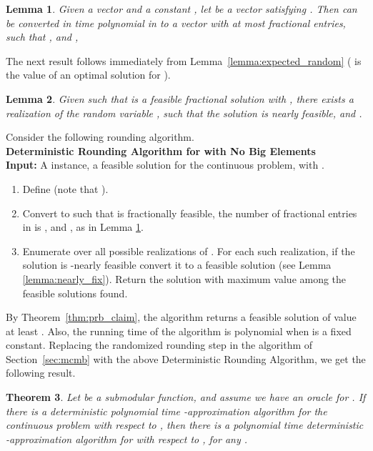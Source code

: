 \documentclass[11pt]{article}
\newtheorem{theorem}{Theorem}[section]
\newtheorem{lemma}[theorem]{Lemma}
\begin{document}
{\begin{lemma}
\label{lemma:multiple_pipage}
Given a vector  and a constant ,
let  be a vector satisfying
.
Then  can be converted in time polynomial in  to a vector
 with at most 
  fractional entries, such that ,
and ,
\end{lemma}


The next result follows immediately from
Lemma~\ref{lemma:expected_random} ( is the value of an optimal solution for ).

\begin{lemma}
\label{lemma:expected_enumeration}
Given  such that  is a feasible fractional solution
with ,
there exists
a realization of the random variable , such that the solution
 is nearly feasible, and .
\end{lemma}
}

Consider the following rounding algorithm.\\

\noindent
{\bf Deterministic Rounding Algorithm for  with No Big Elements} \\
\noindent
{\bf Input:} A  instance, a feasible solution   for the continuous problem, with
.
\begin{enumerate}
\item
Define 
(note that ).
\item Convert  to 
such that  is fractionally feasible, the number
of fractional entries in  is , and
,
as in Lemma \ref{lemma:multiple_pipage}.
\item Enumerate over all possible realizations of .
For each such realization,
if the solution  is -nearly feasible
convert it to a feasible solution  (see Lemma \ref{lemma:nearly_fix}).
Return the solution with maximum value among the feasible solutions found.
\end{enumerate}

By Theorem~\ref{thm:prb_claim}, the algorithm returns a feasible solution of value at least .
Also, the running time of the algorithm is polynomial when  is a fixed
constant. Replacing the
randomized rounding step in the
algorithm of Section~\ref{sec:mcmb} with the above Deterministic Rounding Algorithm,
we get the following result.


\begin{theorem}
\label{thm:continuous_det_eq} Let  be a submodular function,
and assume we have an oracle for . If there is a deterministic
polynomial time -approximation algorithm for the
continuous problem with respect to , then there is a polynomial
time deterministic -approximation algorithm for
 with respect to , for any .
\end{theorem}
\end{document}
